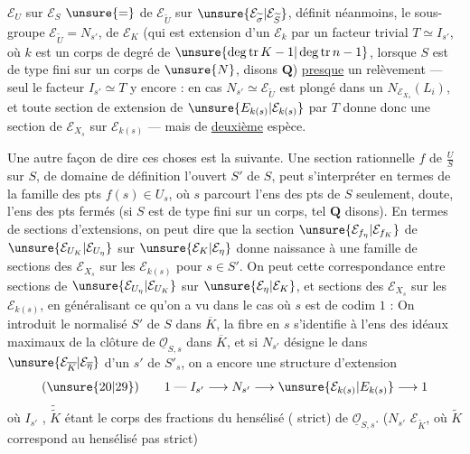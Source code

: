 $\mathcal E_U$ sur $\mathcal E_S$  $\unsure{=}$ de $\mathcal E_{\widetilde U}$ sur $\unsure{\mathcal E_{\widetilde\sigma}|\mathcal E_{\widetilde S}}$, définit néanmoins,  le sous-groupe $\mathcal E_{\widetilde U}=N_{s'}$, de $\mathcal E_K$ (qui est extension d'un $\mathcal E_k$ par un facteur trivial  $T\simeq I_{s'}$, où $k$ est un corps de degré de  $\unsure{\deg\operatorname{tr}K-1|\deg\operatorname{tr}n-1}$, lorsque $S$ est de type fini sur un corps de $\unsure{N}$, disons $\mathbf Q$) \uline{presque} un relèvement --- seul le facteur $I_{s'}\simeq T$ y  encore : en  cas $N_{s'}\simeq\mathcal E_{\widetilde U}$ est plongé dans un $N_{\mathcal E_{X_s}}(L_i)$, et toute section de  extension de $\unsure{E_{k(s)}|\mathcal E_{k(s)}}$ par $T$ donne donc une section de $\mathcal E_{X_s}$ sur $\mathcal E_{k(s)}$ --- mais de \uline{deuxième} espèce.

Une autre façon de dire ces choses est la suivante. Une section rationnelle $f$ de $\frac{U}{S}$ sur $S$, de domaine de définition l'ouvert $S'$ de $S$,  peut s'interpréter en termes de la famille des pts $f(s)\in U_s$, où $s$ parcourt l'ens des pts de $S$
 seulement,  doute, l'ens des pts fermés (si $S$ est de type fini sur un corps, tel $\mathbf Q$ disons). En termes de sections d'extensions, on peut dire que la section $\unsure{\mathcal E_{f_\eta}|\mathcal E_{f_K}}$ de $\unsure{\mathcal E_{U_K}|\mathcal E_{U_\eta}}$ sur $\unsure{\mathcal E_K|\mathcal E_\eta}$ donne naissance à une famille de sections des $\mathcal E_{X_s}$ sur les $\mathcal E_{k(s)}$ pour $s\in S'$. On peut    cette correspondance entre sections de $\unsure{\mathcal E_{U_\eta}|\mathcal E_{U_K}}$ sur $\unsure{\mathcal E_\eta|\mathcal E_K}$, et sections des $\mathcal E_{X_s}$ sur les $\mathcal E_{k(s)}$, en généralisant ce qu'on a vu dans le cas où $s$ est de codim $1$ : On introduit le normalisé $S'$ de $S$ dans $\overline K$, la fibre en $s$ s'identifie à l'ens des idéaux maximaux de la clôture  de $\underline{\mathcal O}_{S,s}$ dans $\overline K$, et si $N_{s'}$ désigne le   dans $\unsure{\mathcal E_{\overline K}|\mathcal E_{\overline\eta}}$ d'un $s'$ de $S'_s$, on a encore une structure d'extension
\[
(\unsure{20|29})\qquad
1\mathrel{\text{---}}I_{s'}\longrightarrow N_{s'}\longrightarrow \unsure{\mathcal E_{k(s)}|E_{k(s)}}\longrightarrow 1
\]
où $I_{s'}$  , $\widetilde{\widetilde K}$ étant le corps des fractions du hensélisé ( strict) de $\underline{\mathcal O}_{S,s}$. ($N_{s'}$   $\mathcal E_{\widetilde K}$, où $\widetilde K$ correspond au hensélisé pas strict)

